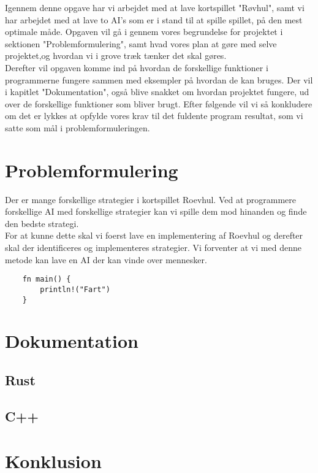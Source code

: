 \documentclass[12pt]{article}
\begin{document}
Igennem denne opgave har vi arbejdet med at lave kortspillet "Røvhul", samt vi har arbejdet med at lave to AI's som er i stand til at spille spillet, på den mest optimale måde. Opgaven vil gå i gennem vores begrundelse for projektet i sektionen "Problemformulering", samt hvad vores plan at gøre med selve projektet,og hvordan vi i grove træk tænker det skal gøres.
\\
Derefter vil opgaven komme ind på hvordan de forskellige funktioner i programmerne fungere sammen med eksempler på hvordan de kan bruges. Der vil i kapitlet "Dokumentation", også blive snakket om hvordan projektet fungere, ud over de forskellige funktioner som bliver brugt. Efter følgende vil vi så konkludere om det er lykkes at opfylde vores krav til det fuldente program resultat, som vi satte som mål i problemformuleringen.

\section{Problemformulering} \label{sec:Problemformulering}

Der er mange forskellige strategier i kortspillet Roevhul. Ved at programmere forskellige AI med forskellige strategier kan vi spille dem mod hinanden og finde den bedste strategi.
\\
For at kunne dette skal vi foerst lave en implementering af Roevhul og derefter skal der identificeres og implementeres strategier. Vi forventer at vi med denne metode kan lave en AI der kan vinde over mennesker.

\begin{verbatim}
	fn main() {
		println!("Fart")
	}
\end{verbatim}

\vfill
\pagebreak

\section{Dokumentation}
\subsection{Rust}

\subsection{C++}


\vfill
\pagebreak

\section{Konklusion}

\vfill
\pagebreak
\end{document}

